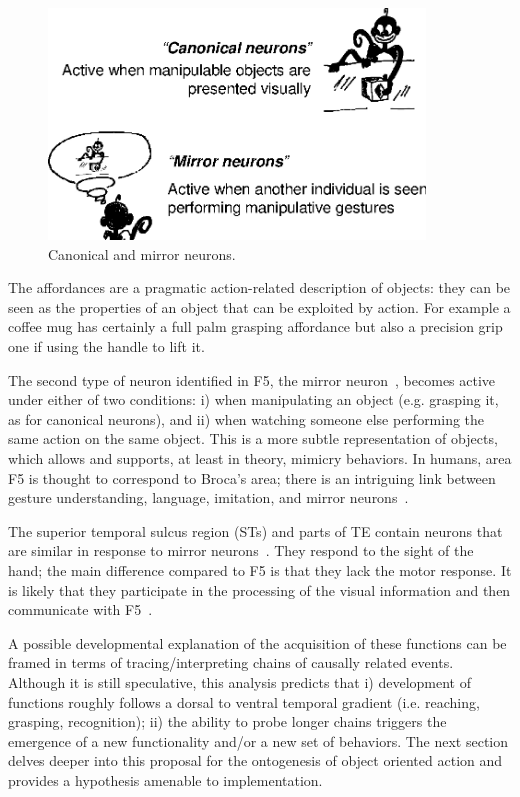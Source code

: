 \begin{figure}[tbh]
\begin{center}
\includegraphics[width=10cm]{fig-canonical-mirror.eps}
\caption{ 
\label{fig:canonical-mirror}
%
Canonical and mirror neurons.
%
}
\end{center}
\end{figure}



\ifverbose
%
The affordances are a pragmatic action-related description of objects:
they can be seen as the properties of an object that can be exploited
by action.  For example a coffee mug has certainly a full palm
grasping affordance but also a precision grip one if using the handle
to lift it.
%
\fi

The second type of neuron identified in F5, the mirror neuron~\cite{fadiga00visuomotor}, becomes active under either of two conditions: i)
when manipulating an object (e.g. grasping it, as for canonical neurons), and ii) when watching
someone else performing the same action on the same object. This is a
more subtle representation of objects, which allows and supports, at
least in theory, mimicry behaviors. In humans, area F5 is thought to
correspond to Broca's area; there is an intriguing link between
gesture understanding, language, imitation, and mirror neurons~\cite{rizzolatti98language}.

The superior temporal sulcus region (STs) and parts of TE contain neurons
that are similar in response to mirror neurons~\cite{perret-mistlin-harries-chitty-1990}. 
They respond to the sight of the hand; the main difference compared to F5
is that they lack the motor response. It is likely that they participate in the 
processing of the visual information and then communicate with 
F5~\cite{gallese-fadiga-fogassi-rizzolatti-1996}.

A possible developmental explanation of the acquisition of
these functions can be framed in terms of tracing/interpreting chains 
of causally related events. Although it is still speculative, this analysis 
predicts that i) development of functions roughly follows a dorsal to ventral 
temporal gradient (i.e. reaching, grasping, recognition); ii) the 
ability to probe longer chains triggers the emergence of a new functionality 
and/or a new set of behaviors. 
The next section delves deeper into
this proposal for the ontogenesis of object oriented action and
provides a hypothesis amenable to implementation.

